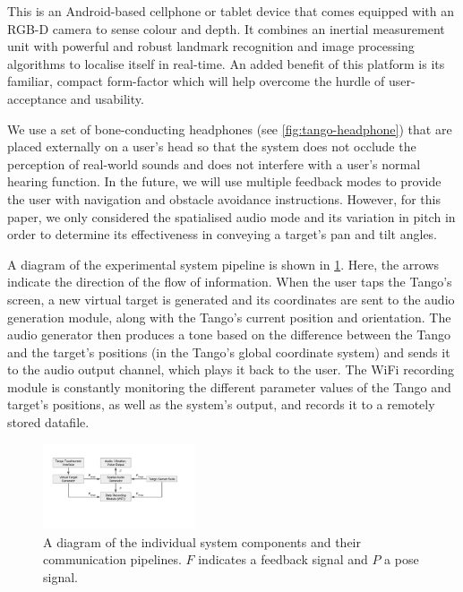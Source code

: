 \documentclass[sigconf, review=true, screen=true, anonymous=true]{acmart}
\begin{document}
This is an Android-based cellphone or tablet device that comes equipped with an RGB-D camera to sense colour and depth.
It combines an inertial measurement unit with powerful and robust landmark recognition and image processing algorithms to localise itself in real-time.
An added benefit of this platform is its familiar, compact form-factor which will help overcome the hurdle of user-acceptance and usability.

We use a set of bone-conducting headphones (see \cref{fig:tango-headphone}) that are placed externally on a user's head so that the system does not occlude the perception of real-world sounds and does not interfere with a user's normal hearing function.
In the future, we will use multiple feedback modes to provide the user with navigation and obstacle avoidance instructions.
However, for this paper, we only considered the spatialised audio mode and its variation in pitch in order to determine its effectiveness in conveying a target's pan and tilt angles.

A diagram of the experimental system pipeline is shown in \cref{fig:pipeline}.
Here, the arrows indicate the direction of the flow of information.
When the user taps the Tango's screen, a new virtual target is generated and its coordinates are sent to the audio generation module, along with the Tango's current position and orientation.
The audio generator then produces a tone based on the difference between the Tango and the target's positions (in the Tango's global coordinate system) and sends it to the audio output channel, which plays it back to the user.
The WiFi recording module is constantly monitoring the different parameter values of the Tango and target's positions, as well as the system's output, and records it to a remotely stored datafile. 

\begin{figure}
  \centering
  \includegraphics[clip=true, trim=50 120 80 50, width=0.4\textwidth]{figures/pipeline.pdf}
  \caption{A diagram of the individual system components and their communication pipelines. $F$ indicates a feedback signal and $P$ a pose signal. }\label{fig:pipeline}
\end{figure}
\end{document}
